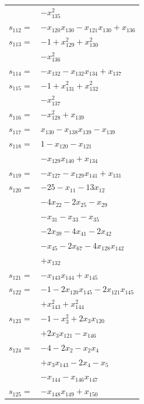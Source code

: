\begin{longtable}{@{}r@{\;}l@{}}
 & \(\displaystyle -x_{135}^{2}\) \\[3pt]
\(s_{112}=\) & \(\displaystyle -x_{120}x_{130} -x_{121}x_{130} +x_{136}\) \\[3pt]
\(s_{113}=\) & \(\displaystyle -1 +x_{129}^{2} +x_{130}^{2}\) \\
 & \(\displaystyle -x_{136}^{2}\) \\[3pt]
\(s_{114}=\) & \(\displaystyle -x_{132} -x_{132}x_{134} +x_{137}\) \\[3pt]
\(s_{115}=\) & \(\displaystyle -1 +x_{131}^{2} +x_{132}^{2}\) \\
 & \(\displaystyle -x_{137}^{2}\) \\[3pt]
\(s_{116}=\) & \(\displaystyle -x_{128}^{2} +x_{139}\) \\[3pt]
\(s_{117}=\) & \(\displaystyle x_{130} -x_{138}x_{139} -x_{139}\) \\[3pt]
\(s_{118}=\) & \(\displaystyle 1 -x_{120} -x_{121}\) \\
 & \(\displaystyle -x_{129}x_{140} +x_{134}\) \\[3pt]
\(s_{119}=\) & \(\displaystyle -x_{127} -x_{129}x_{141} +x_{131}\) \\[3pt]
\(s_{120}=\) & \(\displaystyle -25 -x_{11} -13x_{12}\) \\
 & \(\displaystyle -4x_{22} -2x_{25} -x_{29}\) \\
 & \(\displaystyle -x_{31} -x_{33} -x_{35}\) \\
 & \(\displaystyle -2x_{39} -4x_{41} -2x_{42}\) \\
 & \(\displaystyle -x_{45} -2x_{67} -4x_{128}x_{142}\) \\
 & \(\displaystyle +x_{132}\) \\[3pt]
\(s_{121}=\) & \(\displaystyle -x_{143}x_{144} +x_{145}\) \\[3pt]
\(s_{122}=\) & \(\displaystyle -1 -2x_{120}x_{145} -2x_{121}x_{145}\) \\
 & \(\displaystyle +x_{143}^{2} +x_{144}^{2}\) \\[3pt]
\(s_{123}=\) & \(\displaystyle -1 -x_{3}^{2} +2x_{3}x_{120}\) \\
 & \(\displaystyle +2x_{3}x_{121} -x_{146}\) \\[3pt]
\(s_{124}=\) & \(\displaystyle -4 -2x_{2} -x_{2}x_{4}\) \\
 & \(\displaystyle +x_{3}x_{143} -2x_{4} -x_{5}\) \\
 & \(\displaystyle -x_{144} -x_{146}x_{147}\) \\[3pt]
\(s_{125}=\) & \(\displaystyle -x_{148}x_{149} +x_{150}\) \\[3pt]

\end{longtable}
